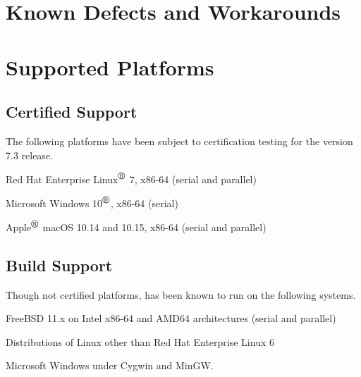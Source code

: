 \documentclass[letterpaper]{scrartcl}
\begin{document}
\newpage
\section{Known Defects and Workarounds}


\newpage
\section{Supported Platforms}
\subsection*{Certified Support}
The following platforms have been subject to certification testing for the
\Xyce{} version 7.3 release.
\begin{XyceItemize}
  \item Red Hat Enterprise Linux${}^{\mbox{\textregistered}}$ 7, x86-64 (serial and parallel)
  \item Microsoft Windows 10${}^{\mbox{\textregistered}}$, x86-64 (serial)
  \item Apple${}^{\mbox{\textregistered}}$ macOS 10.14 and 10.15, x86-64 (serial and parallel)
\end{XyceItemize}


\subsection*{Build Support}
Though not certified platforms, \Xyce{} has been known to run on the following
systems.
\begin{XyceItemize}
  \item FreeBSD 11.x on Intel x86-64 and AMD64 architectures (serial
    and parallel)
  \item Distributions of Linux other than Red Hat Enterprise Linux 6
  \item Microsoft Windows under Cygwin and MinGW.
\end{XyceItemize}
\end{document}
